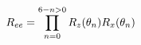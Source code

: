 \begin{equation}
  \centering
  \label{eq:ee_rotation}
  R_{ee} = \prod_{n=0}^{6-n>0}R_z(\theta_n)R_x(\theta_n)
\end{equation}

